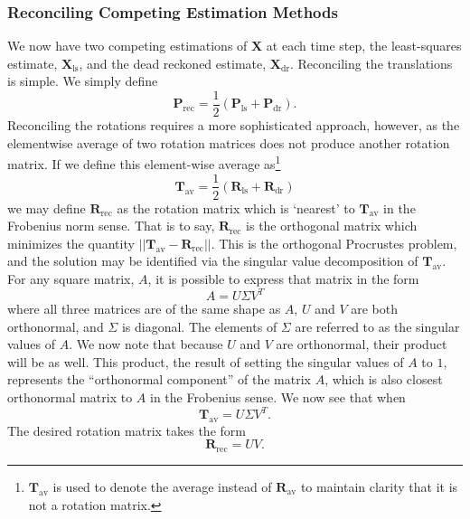 \documentclass{report}
\begin{document}
				\subsubsection{Reconciling Competing Estimation Methods} \label{reconcile}
					We now have two competing estimations of $\mathbf{X}$ at each time step, the least-squares estimate, $\mathbf{X}_{\text{ls}}$, and the dead reckoned estimate, $\mathbf{X}_{\text{dr}}$. Reconciling the translations is simple. We simply define
					\begin{equation}
						\mathbf{P}_{\text{rec}}=\frac{1}{2}\left(\mathbf{P}_{\text{ls}}+\mathbf{P}_{\text{dr}}\right).
					\end{equation}
					Reconciling the rotations requires a more sophisticated approach, however, as the elementwise average of two rotation matrices does not produce another rotation matrix. If we define this element-wise average as\footnote{$\mathbf{T}_{\text{av}}$ is used to denote the average instead of $\mathbf{R}_{\text{av}}$ to maintain clarity that it is not a rotation matrix.}
					\begin{equation}
						\mathbf{T}_{\text{av}}=\frac{1}{2}\left(\mathbf{R}_{\text{ls}}+\mathbf{R}_{\text{dr}}\right)
					\end{equation}
					we may define $\mathbf{R}_{\text{rec}}$ as the rotation matrix which is `nearest' to $\mathbf{T}_{\text{av}}$ in the Frobenius norm sense. That is to say, $\mathbf{R}_{\text{rec}}$ is the orthogonal matrix which minimizes the quantity $\left|\left|\mathbf{T}_{\text{av}}-\mathbf{R}_{\text{rec}}\right|\right|$. This is the orthogonal Procrustes problem, and the solution may be identified via the singular value decomposition of $\mathbf{T}_{\text{av}}$.\cite{linAlgebra} \\[\baselineskip]
					For any square matrix, $A$, it is possible to express that matrix in the form
					\begin{equation}
						A=U{\Sigma}V^T
					\end{equation}
					where all three matrices are of the same shape as $A$, $U$ and $V$ are both orthonormal, and $\Sigma$ is diagonal. The elements of $\Sigma$ are referred to as the singular values of $A$. We now note that because $U$ and $V$ are orthonormal, their product will be as well. This product, the result of setting the singular values of $A$ to $1$, represents the ``orthonormal component'' of the matrix $A$, which is also closest orthonormal matrix to $A$ in the Frobenius sense. We now see that when
					\begin{equation}
						\mathbf{T}_{\text{av}}=U{\Sigma}V^T.
					\end{equation}
					The desired rotation matrix takes the form
					\begin{equation}
						\mathbf{R}_{\text{rec}}=UV.
					\end{equation}
\end{document}
